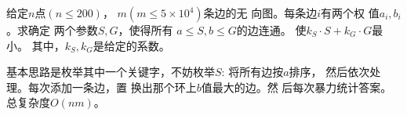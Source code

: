 \begin{prob}
	给定$n$点$(n \le 200)$，
	$m(m \le 5 \times 10^4)$条边的无
	向图。每条边$i$有两个权
	值$a_i,b_i$。求确定
	两个参数$S, G$，使得所有
	$a \le S,b \le G$的边连通。
	使$k_S \cdot S+k_G \cdot G$最小。
	其中，$k_S, k_G$是给定的系数。
\end{prob}

\begin{sol}
	基本思路是枚举其中一个关键字，不妨枚举$S$:
	将所有边按$a$排序，
	然后依次处理。每次添加一条边，置
	换出那个环上$b$值最大的边。然
	后每次暴力统计答案。总复杂度$O(nm)$。
\end{sol}
